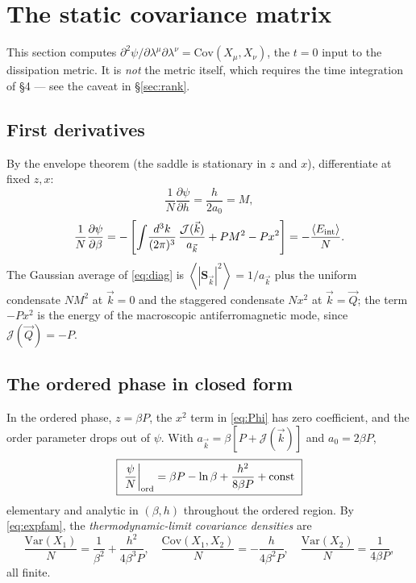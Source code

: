 \documentclass[11pt,a4paper]{article}
\newcommand{\Jc}{\mathcal{J}}
\newcommand{\bk}{\vec k}
\newcommand{\bQ}{\vec Q}
\newcommand{\dk}{\frac{d^3k}{(2\pi)^3}}
\newcommand{\avg}[1]{\left\langle #1 \right\rangle}
\newcommand{\Jc}{\mathcal{J}}
\newcommand{\bk}{\vec k}
\newcommand{\bQ}{\vec Q}
\newcommand{\dk}{\frac{d^3k}{(2\pi)^3}}
\newcommand{\avg}[1]{\left\langle #1 \right\rangle}
\begin{document}
\section{The static covariance matrix}
\noindent
This section computes $\partial^2\psi/\partial\lambda^\mu\partial\lambda^\nu=\mathrm{Cov}(X_\mu,X_\nu)$,
the $t=0$ input to the dissipation metric. It is \emph{not} the metric itself, which
requires the time integration of \S4 --- see the caveat in \S\ref{sec:rank}.
\subsection{First derivatives}
By the envelope theorem (the saddle is stationary in $z$ and $x$), differentiate at fixed
$z,x$:
\begin{equation}
  \frac{1}{N}\frac{\partial\psi}{\partial h}=\frac{h}{2a_0}=M ,
\end{equation}
\begin{equation}
  \frac{1}{N}\frac{\partial\psi}{\partial\beta}
   =-\left[\int\!\dk\,\frac{\Jc(\bk)}{a_{\bk}}+PM^2-Px^2\right]
   =-\frac{\avg{E_{\rm int}}}{N}.
\end{equation}
The Gaussian average of \eqref{eq:diag} is $\avg{|\bm S_{\bk}|^2}=1/a_{\bk}$ plus the
uniform condensate $NM^2$ at $\bk=0$ and the staggered condensate $Nx^2$ at $\bk=\bQ$; the
term $-Px^2$ is the energy of the macroscopic antiferromagnetic mode, since
$\Jc(\bQ)=-P$. \checkmark

\subsection{The ordered phase in closed form}
\label{sec:ordered}
In the ordered phase, $z=\beta P$, the $x^2$ term in \eqref{eq:Phi} has zero coefficient, and the order
parameter drops out of $\psi$. With $a_{\bk}=\beta[P+\Jc(\bk)]$ and $a_0=2\beta P$,
\begin{equation}
  \boxed{\ \frac{\psi}{N}\bigg|_{\rm ord}=\beta P-\ln\beta+\frac{h^2}{8\beta P}+\mathrm{const}\ }
  \label{eq:psiord}
\end{equation}
elementary and analytic in $(\beta,h)$ throughout the ordered region. By \eqref{eq:expfam},
the \emph{thermodynamic-limit covariance densities} are
\begin{equation}
  \frac{\mathrm{Var}(X_1)}{N}=\frac{1}{\beta^2}+\frac{h^2}{4\beta^3P},
  \quad
  \frac{\mathrm{Cov}(X_1,X_2)}{N}=-\frac{h}{4\beta^2P},
  \quad
  \frac{\mathrm{Var}(X_2)}{N}=\frac{1}{4\beta P},
  \label{eq:ordhess}
\end{equation}
all finite. 
\end{document}
